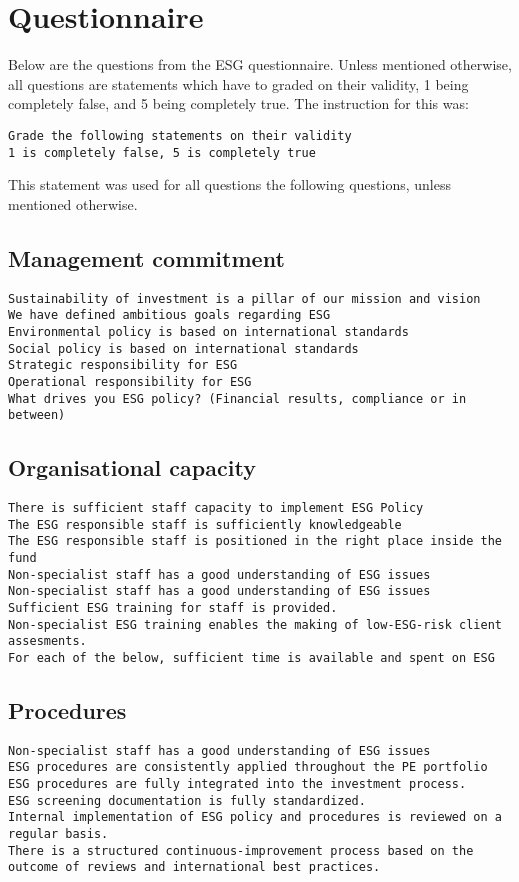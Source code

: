 \documentclass[twoside,12pt]{article}
\begin{document}
\section{Questionnaire}
\label{app:questionnaire}
Below are the questions from the ESG questionnaire. Unless mentioned otherwise, all questions are statements which have to graded on their validity, 1 being completely false, and 5 being completely true. The instruction for this was:

\begin{lstlisting}
Grade the following statements on their validity
1 is completely false, 5 is completely true
\end{lstlisting}
This statement was used for all questions the following questions, unless mentioned otherwise.

\subsection{Management commitment}
\begin{lstlisting}
Sustainability of investment is a pillar of our mission and vision
We have defined ambitious goals regarding ESG
Environmental policy is based on international standards
Social policy is based on international standards
Strategic responsibility for ESG
Operational responsibility for ESG
What drives you ESG policy? (Financial results, compliance or in between)
\end{lstlisting}

\subsection{Organisational capacity}
\begin{lstlisting}
There is sufficient staff capacity to implement ESG Policy
The ESG responsible staff is sufficiently knowledgeable
The ESG responsible staff is positioned in the right place inside the fund
Non-specialist staff has a good understanding of ESG issues
Non-specialist staff has a good understanding of ESG issues
Sufficient ESG training for staff is provided.
Non-specialist ESG training enables the making of low-ESG-risk client assesments.
For each of the below, sufficient time is available and spent on ESG
\end{lstlisting}

\subsection{Procedures}
\begin{lstlisting}
Non-specialist staff has a good understanding of ESG issues
ESG procedures are consistently applied throughout the PE portfolio
ESG procedures are fully integrated into the investment process.
ESG screening documentation is fully standardized.
Internal implementation of ESG policy and procedures is reviewed on a regular basis.
There is a structured continuous-improvement process based on the outcome of reviews and international best practices.
\end{lstlisting}
\end{document}

